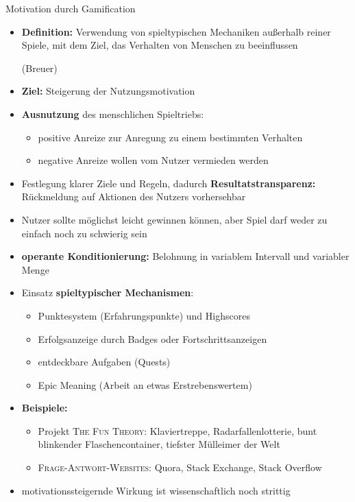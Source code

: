 \documentclass[final,20pt]{beamer}
\newlength{\colwidth}
\begin{document}
\begin{frame}[t]
\begin{columns}[t]
\begin{column}{\colwidth}
  \begin{alertblock}{Motivation durch Gamification}
  	\begin{itemize}
  		\item \textbf{Definition:} Verwendung von spieltypischen Mechaniken außerhalb reiner Spiele, mit dem Ziel, das Verhalten von Menschen zu beeinflussen \begin{small}(Breuer)\end{small}
  		\item \textbf{Ziel:} Steigerung der Nutzungsmotivation
  		\item \textbf{Ausnutzung} des menschlichen Spieltriebs:
  		\begin{itemize}
  			\item positive Anreize zur Anregung zu einem bestimmten Verhalten
  			\item negative Anreize wollen vom Nutzer vermieden werden
  		\end{itemize}
  		\item Festlegung klarer Ziele und Regeln, dadurch \textbf{Resultatstransparenz:} Rückmeldung auf Aktionen des Nutzers vorhersehbar
  		\item Nutzer sollte möglichst leicht gewinnen können, aber Spiel darf weder zu einfach noch zu schwierig sein
  		\item \textbf{operante Konditionierung:} Belohnung in variablem Intervall und variabler Menge
  		\item Einsatz \textbf{spieltypischer Mechanismen}:
  		\begin{itemize}
  			\item Punktesystem (Erfahrungspunkte) und Highscores
  			\item Erfolgsanzeige durch Badges oder Fortschrittsanzeigen
  			\item entdeckbare Aufgaben (Quests)
  			\item Epic Meaning (Arbeit an etwas Erstrebenswertem)
  		\end{itemize}
  		\item \textbf{Beispiele:}
  		\begin{itemize}
  			\item Projekt \textsc{The Fun Theory:} Klaviertreppe, Radarfallenlotterie, bunt blinkender Flaschencontainer, tiefster Mülleimer der Welt
  			\item \textsc{Frage-Antwort-Websites:} Quora, Stack Exchange, Stack Overflow
  		\end{itemize}
  	\item motivationssteigernde Wirkung ist wissenschaftlich noch strittig

\end{itemize}
\end{alertblock}
\end{column}
\end{columns}
\end{frame}
\end{document}
